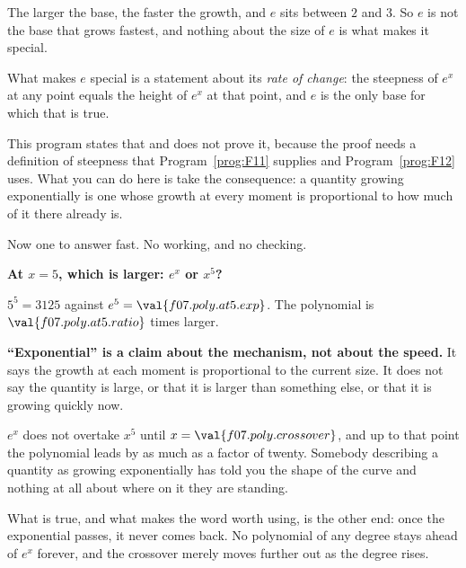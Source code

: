 \begin{fr}
The larger the base, the faster the growth, and $e$ sits between $2$ and $3$.
So $e$ is not the base that grows fastest, and nothing about the size of $e$
is what makes it special.

\begin{rigourbox}
What makes $e$ special is a statement about its \emph{rate of change}: the
steepness of $e^{x}$ at any point equals the height of $e^{x}$ at that point,
and $e$ is the only base for which that is true.

This program states that and does not prove it, because the proof needs a
definition of steepness that Program~\ref{prog:F11} supplies and
Program~\ref{prog:F12} uses. What you can do here is take the consequence: a
quantity growing exponentially is one whose growth at every moment is
proportional to how much of it there already is.
\end{rigourbox}

Now one to answer fast. No working, and no checking.

\textbf{At $x = 5$, which is larger: $e^{x}$ or $x^{5}$?}
\dotline
\nextframe
\end{fr}

\begin{fr}
$5^{5} = 3125$ against $e^{5} = \val{f07.poly.at5.exp}$. The polynomial is
$\val{f07.poly.at5.ratio}$ times larger.

\begin{trapbox}
\textbf{\enquote{Exponential} is a claim about the mechanism, not about the
speed.} It says the growth at each moment is proportional to the current size.
It does not say the quantity is large, or that it is larger than something
else, or that it is growing quickly now.

$e^{x}$ does not overtake $x^{5}$ until $x = \val{f07.poly.crossover}$, and up
to that point the polynomial leads by as much as a factor of twenty. Somebody
describing a quantity as growing exponentially has told you the shape of the
curve and nothing at all about where on it they are standing.

What is true, and what makes the word worth using, is the other end: once the
exponential passes, it never comes back. No polynomial of any degree stays
ahead of $e^{x}$ forever, and the crossover merely moves further out as the
degree rises.
\end{trapbox}
\end{fr}

